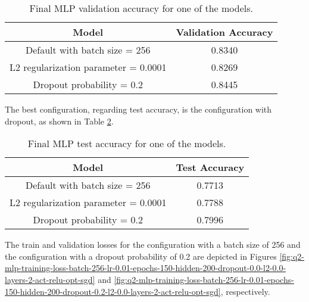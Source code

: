 \documentclass[12pt]{article}
\begin{document}
\begin{enumerate}[leftmargin=\labelsep]
\begin{enumerate}[label=\alph*)]
                    \begin{table}[H]
                        \centering
                        \begin{tabular}{|c|c|}
                            \hline
                            \textbf{Model}                       & \textbf{Validation Accuracy} \\ \hline
                            Default with batch size = 256        & 0.8340                       \\ \hline
                            L2 regularization parameter = 0.0001 & 0.8269                       \\ \hline
                            Dropout probability = 0.2            & 0.8445                       \\ \hline
                        \end{tabular}
                        \caption{Final MLP validation accuracy for one of the models.}
                        \label{tab:mlp-configuration-accuracy}
                    \end{table}

                    The best configuration, regarding test accuracy, is the configuration with dropout, as shown in Table \ref{tab:mlp-configuration-test-accuracy}.

                    \begin{table}[H]
                        \centering
                        \begin{tabular}{|c|c|}
                            \hline
                            \textbf{Model}                       & \textbf{Test Accuracy} \\ \hline
                            Default with batch size = 256        & 0.7713                 \\ \hline
                            L2 regularization parameter = 0.0001 & 0.7788                 \\ \hline
                            Dropout probability = 0.2            & 0.7996                 \\ \hline
                        \end{tabular}
                        \caption{Final MLP test accuracy for one of the models.}
                        \label{tab:mlp-configuration-test-accuracy}
                    \end{table}

                    The train and validation losses for the configuration with a batch size of 256 and the configuration with a dropout probability of 0.2 are depicted in Figures \ref{fig:q2-mlp-training-loss-batch-256-lr-0.01-epochs-150-hidden-200-dropout-0.0-l2-0.0-layers-2-act-relu-opt-sgd} and \ref{fig:q2-mlp-training-loss-batch-256-lr-0.01-epochs-150-hidden-200-dropout-0.2-l2-0.0-layers-2-act-relu-opt-sgd}, respectively.


\end{enumerate}
\end{enumerate}
\end{document}

